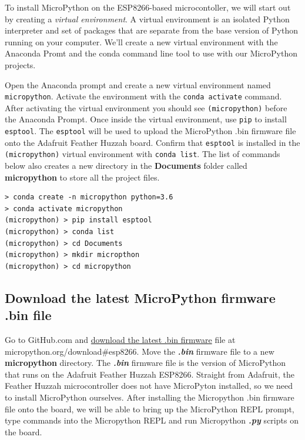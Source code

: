 \documentclass{book}
\begin{document}
    
        To install MicroPython on the ESP8266-based microcontoller, we will
start out by creating a \emph{virtual environment}. A virtual
environment is an isolated Python interpreter and set of packages that
are separate from the base version of Python running on your computer.
We'll create a new virtual environment with the Anaconda Promt and the
conda command line tool to use with our MicroPython projects.

Open the Anaconda prompt and create a new virtual environment named
\lstinline!micropython!. Activate the environment with the
\lstinline!conda activate! command. After activating the virtual
environment you should see \lstinline!(micropython)! before the Anaconda
Prompt. Once inside the virtual environment, use \lstinline!pip! to
install \lstinline!esptool!. The \lstinline!esptool! will be used to
upload the MicroPython .bin firmware file onto the Adafruit Feather
Huzzah board. Confirm that \lstinline!esptool! is installed in the
\lstinline!(micropython)! virtual environment with
\lstinline!conda list!. The list of commands below also creates a new
directory in the \textbf{Documents} folder called \textbf{micropython}
to store all the project files.

\begin{lstlisting}
> conda create -n micropython python=3.6
> conda activate micropython
(micropython) > pip install esptool
(micropython) > conda list
(micropython) > cd Documents
(micropython) > mkdir micropthon
(micropython) > cd micropython
\end{lstlisting}
    




    
        \subsection{Download the latest MicroPython firmware .bin
file}\label{download-the-latest-micropython-firmware-.bin-file}
    




    
        Go to GitHub.com and
\href{https://micropython.org/download\#esp8266}{download the latest
.bin firmware} file at micropython.org/download\#esp8266. Move the
\textbf{\emph{.bin}} firmware file to a new \textbf{micropython}
directory. The \textbf{\emph{.bin}} firmware file is the version of
MicroPython that runs on the Adafruit Feather Huzzah ESP8266. Straight
from Adafruit, the Feather Huzzah microcontroller does not have
MicroPyton installed, so we need to install MicroPython ourselves. After
installing the Micropython .bin firmware file onto the board, we will be
able to bring up the MicroPython REPL prompt, type commands into the
Micropython REPL and run Micropython \textbf{\emph{.py}} scripts on the
board.
\end{document}
